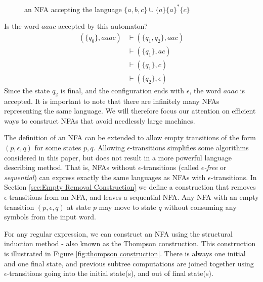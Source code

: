 \begin{figure}[H]
  \centering
  
  \caption{an NFA accepting the language $\{a, b, c\} \cup \{a\}\{a\}^*\{c\}$}
  \label{fig:nfa_a+b+a*c}
\end{figure}

Is the word $aaac$ accepted by this automaton?
\begin{align*}
  (\{q_0\}, aaac) & \vdash (\{q_1, q_2\}, aac) \\
  & \vdash (\{q_1\}, ac) \\
  & \vdash (\{q_1\}, c) \\
  & \vdash (\{q_2\}, \epsilon)
\end{align*}
Since the state $q_2$ is final, and the configuration ends with $\epsilon$, the word $aaac$ is accepted. It is important to note that there are infinitely many NFAs representing the same language. We will therefore focus our attention on efficient ways to construct NFAs that avoid needlessly large machines.

The definition of an NFA can be extended to allow empty transitions of the form $(p, \epsilon, q)$ for some states $p, q$. Allowing $\epsilon$-transitions simplifies some algorithms considered in this paper, but does not result in a more powerful language describing method. That is, NFAs without $\epsilon$-transitions (called \emph{$\epsilon$-free} or \emph{sequential}) can express exactly the same languages as NFAs with $\epsilon$-transitions. In Section \ref{sec:Empty Removal Construction} we define a construction that removes $\epsilon$-transitions from an NFA, and leaves a sequential NFA. Any NFA with an empty transition $(p, \epsilon, q)$ at state $p$ may move to state $q$ without consuming any symbols from the input word.

For any regular expression, we can construct an NFA using the structural induction method - also known as the Thompson construction. This construction is illustrated in Figure \ref{fig:thompson construction}. There is always one initial and one final state, and previous subtree computations are joined together using $\epsilon$-transitions going into the initial state(s), and out of final state(s). 


